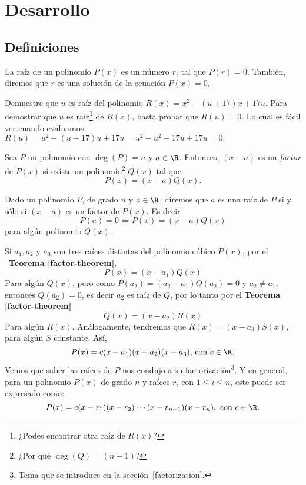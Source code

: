 \section{Desarrollo}\label{sec:desarrollo}

\subsection{Definiciones}
{
    \begin{section-definition}
        La raíz de un polinomio $P(x)$ es un número $r$, tal que $P(r) = 0$. También, diremos que $r$ es una solución de la ecuación $P(x) = 0$.
    \end{section-definition}

    \begin{example}
        Demuestre que $u$ es raíz del polinomio $R(x) = x^2 - (u + 17) x + 17u$.
        \solution
        {
            Para demostrar que $u$ es raíz\footnote{¿Podés encontrar otra raíz de $R(x)$?} de $R(x)$, basta probar que $R(u) = 0$. Lo cual es fácil ver cuando evaluamos $R(u) = u^2 - (u+17)u + 17u = u^2 - u^2 - 17u + 17u = 0.$
        }
    \end{example}


    \begin{section-definition}
        Sea $P$ un polinomio con $\deg{(P)} = n$ y $a \in \R$. Entonces, $(x - a)$ es un \emph{factor} de $P(x)$ si existe un polinomio\footnote{¿Por qué $\deg{(Q)} = (n-1)$?} $Q(x)$ tal que \[P(x) = (x-a)Q(x).\]
    \end{section-definition}

    \begin{theorem}\label{factor-theorem}
        Dado un polinomio $P$, de grado $n$ y $a \in \R$, diremos que $a$ es una raíz de $P$ si y sólo si $(x-a)$ es un factor de $P(x)$. Es decir \[P(a) = 0 \Leftrightarrow P(x) = (x-a)Q(x)\] para algún polinomio $Q(x).$
    \end{theorem}

    Si $a_1, a_2 \mbox{ y } a_3$ son tres raíces distintas del polinomio cúbico $P(x)$, por el ~\textbf{Teorema \ref{factor-theorem}},
    \[P(x) = (x - a_1)Q(x)\]
    Para algún $Q(x)$, pero como $P(a_2) = (a_2 - a_1)Q(a_2) = 0$ y $a_2 \neq a_1$, entonces $Q(a_2) = 0$, es decir $a_2$ es raíz de $Q$, por lo tanto por el \textbf{Teorema \ref{factor-theorem}}
    \[Q(x) = (x - a_2)R(x)\]
    Para algún $R(x)$. Análogamente, tendremos que $R(x) = (x - a_3)S(x)$, para algún $S$ constante. Así,
    \[P(x) = c(x - a_1)(x - a_2)(x - a_3) \mbox{, con } c \in \R.\]
    Vemos que saber las raíces de $P$ nos condujo a su factorización\footnote{Tema que se introduce en la sección~\ref{factorization}.}. Y en general, para un polinomio $P(x)$ de grado $n$ y raíces $r_i \mbox{ con } 1 \leq i \leq n$, este puede ser expresado como:
    \[P(x) = c(x - r_1)(x - r_2)\cdots(x - r_{n-1})(x - r_n), \mbox{ con } c \in \R.\]

}
